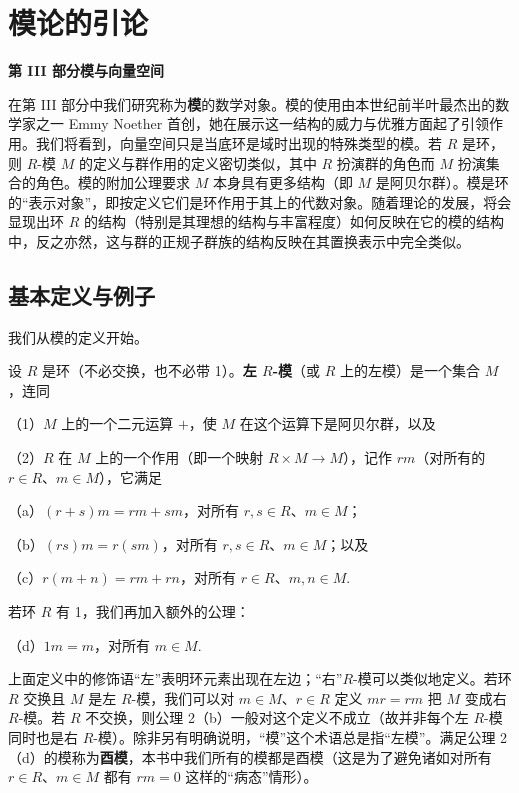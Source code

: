 
\setcounter{chapter}{9}

\chapter{模论的引论}

\noindent\textbf{第 III 部分\quad 模与向量空间}

\medskip

在第 III 部分中我们研究称为\textbf{模}的数学对象。模的使用由本世纪前半叶最杰出的数学家之一 Emmy Noether 首创，她在展示这一结构的威力与优雅方面起了引领作用。我们将看到，向量空间只是当底环是域时出现的特殊类型的模。若 \(R\) 是环，则 \(R\)-模 \(M\) 的定义与群作用的定义密切类似，其中 \(R\) 扮演群的角色而 \(M\) 扮演集合的角色。模的附加公理要求 \(M\) 本身具有更多结构（即 \(M\) 是阿贝尔群）。模是环的“表示对象”，即按定义它们是环作用于其上的代数对象。随着理论的发展，将会显现出环 \(R\) 的结构（特别是其理想的结构与丰富程度）如何反映在它的模的结构中，反之亦然，这与群的正规子群族的结构反映在其置换表示中完全类似。

\section{基本定义与例子}

我们从模的定义开始。

\begin{definition}
设 \(R\) 是环（不必交换，也不必带 1）。\textbf{左 \(R\)-模}（或 \(R\) 上的左模）是一个集合 \(M\)，连同

（1）\(M\) 上的一个二元运算 \(+\)，使 \(M\) 在这个运算下是阿贝尔群，以及

（2）\(R\) 在 \(M\) 上的一个作用（即一个映射 \(R \times M \to M\)），记作 \(rm\)（对所有的 \(r \in R\)、\(m \in M\)），它满足

（a）\((r+s)m = rm+sm\)，对所有 \(r, s \in R\)、\(m \in M\)；

（b）\((rs)m = r(sm)\)，对所有 \(r, s \in R\)、\(m \in M\)；以及

（c）\(r(m+n) = rm+rn\)，对所有 \(r \in R\)、\(m, n \in M\).
\end{definition}

若环 \(R\) 有 1，我们再加入额外的公理：

（d）\(1m = m\)，对所有 \(m \in M\).

上面定义中的修饰语“左”表明环元素出现在左边；“右”\(R\)-模可以类似地定义。若环 \(R\) 交换且 \(M\) 是左 \(R\)-模，我们可以对 \(m \in M\)、\(r \in R\) 定义 \(mr = rm\) 把 \(M\) 变成右 \(R\)-模。若 \(R\) 不交换，则公理 2（b）一般对这个定义不成立（故并非每个左 \(R\)-模同时也是右 \(R\)-模）。除非另有明确说明，“模”这个术语总是指“左模”。满足公理 2（d）的模称为\textbf{酉模}，本书中我们所有的模都是酉模（这是为了避免诸如对所有 \(r \in R\)、\(m \in M\) 都有 \(rm = 0\) 这样的“病态”情形）。


